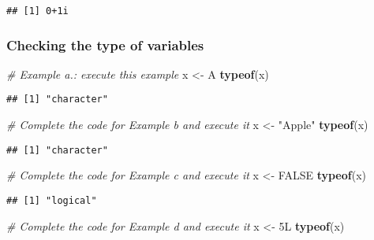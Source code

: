 \documentclass[
]{article}
\newenvironment{Shaded}{\begin{snugshade}}{\end{snugshade}}
\newcommand{\CommentTok}[1]{\textcolor[rgb]{0.56,0.35,0.01}{\textit{#1}}}
\newcommand{\ConstantTok}[1]{\textcolor[rgb]{0.56,0.35,0.01}{#1}}
\newcommand{\FunctionTok}[1]{\textcolor[rgb]{0.13,0.29,0.53}{\textbf{#1}}}
\newcommand{\NormalTok}[1]{#1}
\newcommand{\OtherTok}[1]{\textcolor[rgb]{0.56,0.35,0.01}{#1}}
\newcommand{\StringTok}[1]{\textcolor[rgb]{0.31,0.60,0.02}{#1}}
\begin{document}
\begin{verbatim}
## [1] 0+1i
\end{verbatim}

\hypertarget{checking-the-type-of-variables}{%
\subsubsection{Checking the type of
variables}\label{checking-the-type-of-variables}}

\begin{Shaded}
\begin{Highlighting}[]
\CommentTok{\# Example a.: execute this example}
\NormalTok{x }\OtherTok{\textless{}{-}} \StringTok{\textquotesingle{}A\textquotesingle{}}
\FunctionTok{typeof}\NormalTok{(x)}
\end{Highlighting}
\end{Shaded}

\begin{verbatim}
## [1] "character"
\end{verbatim}

\begin{Shaded}
\begin{Highlighting}[]
\CommentTok{\# Complete the code for Example b and execute it}
\NormalTok{x }\OtherTok{\textless{}{-}} \StringTok{"Apple"}
\FunctionTok{typeof}\NormalTok{(x)}
\end{Highlighting}
\end{Shaded}

\begin{verbatim}
## [1] "character"
\end{verbatim}

\begin{Shaded}
\begin{Highlighting}[]
\CommentTok{\# Complete the code for Example c and execute it}
\NormalTok{x }\OtherTok{\textless{}{-}} \ConstantTok{FALSE}
\FunctionTok{typeof}\NormalTok{(x)}
\end{Highlighting}
\end{Shaded}

\begin{verbatim}
## [1] "logical"
\end{verbatim}

\begin{Shaded}
\begin{Highlighting}[]
\CommentTok{\# Complete the code for Example d and execute it}
\NormalTok{x }\OtherTok{\textless{}{-}}\NormalTok{ 5L}
\FunctionTok{typeof}\NormalTok{(x)}
\end{Highlighting}
\end{Shaded}
\end{document}
